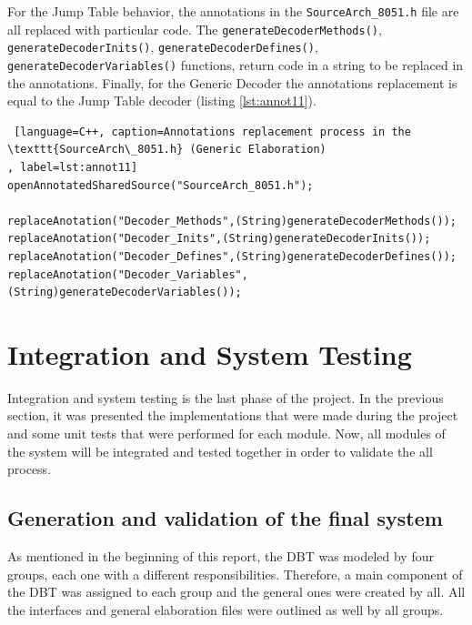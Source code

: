 \documentclass[12pt]{article}
\begin{document}
{For the Jump Table behavior, the annotations in the \texttt{SourceArch\_8051.h} file are all replaced with particular code. The \texttt{generateDecoderMethods()}, \texttt{generateDecoderInits()}, \texttt{generateDecoderDefines()}, \texttt{generateDecoderVariables()} functions, return code in a string to be replaced in the annotations. Finally, for the Generic Decoder the annotations replacement is equal to the Jump Table decoder (listing \ref{lst:annot11}).

\begin{lstlisting} [language=C++, caption=Annotations replacement process in the \texttt{SourceArch\_8051.h} (Generic Elaboration)
, label=lst:annot11]
openAnnotatedSharedSource("SourceArch_8051.h");
		
replaceAnotation("Decoder_Methods",(String)generateDecoderMethods());
replaceAnotation("Decoder_Inits",(String)generateDecoderInits());
replaceAnotation("Decoder_Defines",(String)generateDecoderDefines());
replaceAnotation("Decoder_Variables",(String)generateDecoderVariables());
\end{lstlisting}




\newpage
\section{Integration and System Testing}

Integration and system testing is the last phase of the project. In the previous section, it was presented the implementations that were made during the project and some unit tests that were performed for each module. Now, all modules of the system will be integrated and tested together in order to validate the all process.

\subsection{Generation and validation of the final system}

As mentioned in the beginning of this report, the DBT was modeled by four groups, each one with a different responsibilities. Therefore, a main component of the DBT was assigned to each group and the general ones were created by all. All the interfaces and general elaboration files were outlined as well by all groups. \\

}
\end{document}
